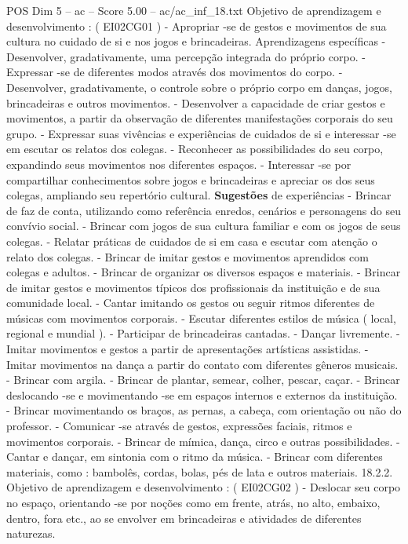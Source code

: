 \begin{textsample}{POS Dim 5 – ac – Score 5.00 – ac/ac\_inf\_18.txt}
Objetivo de aprendizagem e desenvolvimento : ( EI02CG01 ) - Apropriar -se de gestos e movimentos de sua cultura no cuidado de si e nos jogos e brincadeiras.
Aprendizagens específicas - Desenvolver, gradativamente, uma percepção integrada do próprio corpo. - Expressar -se de diferentes modos através dos movimentos do corpo. - Desenvolver, gradativamente, o controle sobre o próprio corpo em danças, jogos, brincadeiras e outros movimentos. - Desenvolver a capacidade de criar gestos e movimentos, a partir da observação de diferentes manifestações corporais do seu grupo. - Expressar suas vivências e experiências de cuidados de si e interessar -se em escutar os relatos dos colegas. - Reconhecer as possibilidades do seu corpo, expandindo seus movimentos nos diferentes espaços. - Interessar -se por compartilhar conhecimentos sobre jogos e brincadeiras e apreciar os dos seus colegas, ampliando seu repertório cultural. \textbf{Sugestões} de experiências - Brincar de faz de conta, utilizando como referência enredos, cenários e personagens do seu convívio social. - Brincar com jogos de sua cultura familiar e com os jogos de seus colegas. - Relatar práticas de cuidados de si em casa e escutar com atenção o relato dos colegas. - Brincar de imitar gestos e movimentos aprendidos com colegas e adultos. - Brincar de organizar os diversos espaços e materiais. - Brincar de imitar gestos e movimentos típicos dos profissionais da instituição e de sua comunidade local. - Cantar imitando os gestos ou seguir ritmos diferentes de músicas com movimentos corporais. - Escutar diferentes estilos de música ( local, regional e mundial ). - Participar de brincadeiras cantadas. - Dançar livremente. - Imitar movimentos e gestos a partir de apresentações artísticas assistidas. - Imitar movimentos na dança a partir do contato com diferentes gêneros musicais. - Brincar com argila. - Brincar de plantar, semear, colher, pescar, caçar. - Brincar deslocando -se e movimentando -se em espaços internos e externos da instituição. - Brincar movimentando os braços, as pernas, a cabeça, com orientação ou não do professor. - Comunicar -se através de gestos, expressões faciais, ritmos e movimentos corporais. - Brincar de mímica, dança, circo e outras possibilidades. - Cantar e dançar, em sintonia com o ritmo da música. - Brincar com diferentes materiais, como : bambolês, cordas, bolas, pés de lata e outros materiais. 18.2.2.
Objetivo de aprendizagem e desenvolvimento : ( EI02CG02 ) - Deslocar seu corpo no espaço, orientando -se por noções como em frente, atrás, no alto, embaixo, dentro, fora etc., ao se envolver em brincadeiras e atividades de diferentes naturezas.

\end{textsample}

